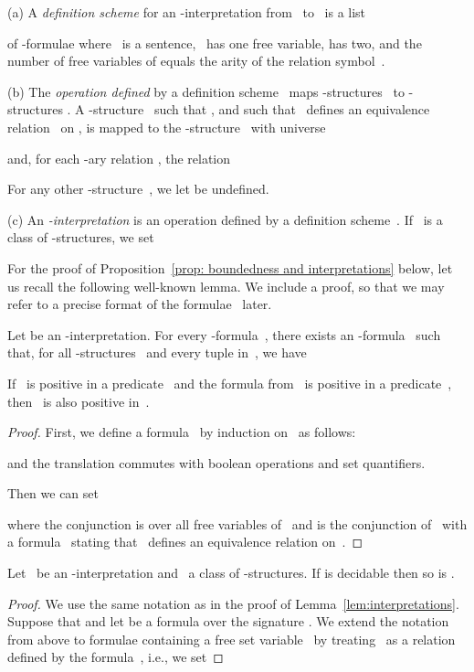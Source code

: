 \documentclass{LMCS}
\begin{document}
\begin{thm}
\begin{defi}
\textup{(a)} A \emph{definition scheme} for an -interpretation
from~ to~ is a list

of -formulae where
~is a sentence,
~has one free variable,  has two,
and the number of free variables of  equals the arity of the
relation symbol~.

\textup{(b)} The \emph{operation defined} by a definition scheme~
maps -structures~ to -structures .
A -structure~ such that
,  
and such that ~defines an equivalence relation~
on , 
is mapped to the -structure~ with universe

and, for each -ary relation , the relation

For any other -structure~, we let  be undefined.

\textup{(c)} An \emph{-interpretation} is an operation defined
by a definition scheme~.
If ~is a class of -structures, we set

\end{defi}

For the proof of Proposition~\ref{prop: boundedness and interpretations} below,
let us recall the following well-known lemma.
We include a proof, so that we may refer to a
precise format of the formulae~ later.
\begin{lem}\label{lem:interpretations}
Let 
be an -interpretation.
For every -formula~,
there exists an -formula~ such that,
for all -structures~ and every tuple  in~, we have


If ~is positive in a predicate~ and the
formula  from~ is positive
in a predicate~, then ~is also positive in~.
\end{lem}
\begin{proof}
First, we define a formula~ by induction on~ as follows\?:

and the translation  commutes with boolean operations and set quantifiers.

Then we can set

where
the conjunction is over all free variables of~ and
 is the conjunction of~ with a formula~ stating
that ~defines an equivalence relation on~.
\end{proof}

\begin{prop}\label{prop: boundedness and interpretations}
Let ~be an -interpretation and
~a class of -structures.
If\/  is decidable then so is .
\end{prop}
\begin{proof}
We use the same notation as in the proof of Lemma~\ref{lem:interpretations}.
Suppose that 
and let  be a formula over the signature .
We extend the notation~ from above to formulae containing a free
set variable~ by treating~ as a relation defined by the formula~, i.e.,
we set


\end{proof}
\end{thm}
\end{document}
